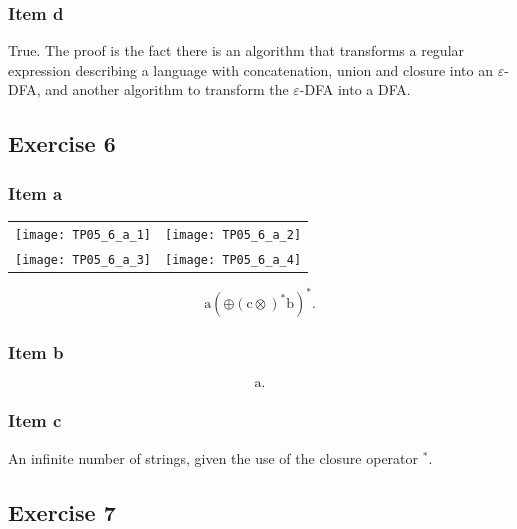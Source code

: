 {\subsubsection{Item d}
True. The proof is the fact there is an algorithm that transforms a regular expression describing a language with concatenation, union and closure into an $\varepsilon$-DFA, and another algorithm to transform the $\varepsilon$-DFA into a DFA.
\subsection{Exercise 6}
\subsubsection{Item a}
\begin{center}
\begin{tabular}{c c}
\texttt{[image: TP05\_6\_a\_1]} &
\texttt{[image: TP05\_6\_a\_2]} \\
\texttt{[image: TP05\_6\_a\_3]} &
\texttt{[image: TP05\_6\_a\_4]}
\end{tabular}
\end{center}
\begin{equation*}
	\text{a}(\oplus (\text{c} \otimes )^* \text{b})^* .
\end{equation*}
\subsubsection{Item b}
\begin{equation*}
	\text{a}.
\end{equation*}
\subsubsection{Item c}
An infinite number of strings, given the use of the closure operator $^*$.
\pagebreak
\subsection{Exercise 7}
}
